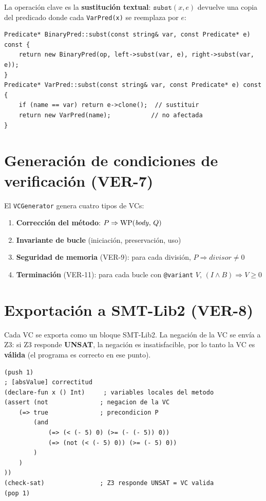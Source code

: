 La operación clave es la \textbf{sustitución textual}:
$\texttt{subst}(x, e)$ devuelve una copia del predicado donde cada
\texttt{VarPred(x)} se reemplaza por $e$:

\begin{lstlisting}[style=cpp, caption={Sustitución en BinaryPred}]
Predicate* BinaryPred::subst(const string& var, const Predicate* e) const {
    return new BinaryPred(op, left->subst(var, e), right->subst(var, e));
}
Predicate* VarPred::subst(const string& var, const Predicate* e) const {
    if (name == var) return e->clone();  // sustituir
    return new VarPred(name);           // no afectada
}
\end{lstlisting}

\section{Generación de condiciones de verificación (VER-7)}

El \texttt{VCGenerator} genera cuatro tipos de VCs:

\begin{enumerate}
  \item \textbf{Corrección del método}: $P \Rightarrow \mathrm{WP}(\mathit{body},\,Q)$
  \item \textbf{Invariante de bucle} (iniciación, preservación, uso)
  \item \textbf{Seguridad de memoria} (VER-9): para cada división,
    $P \Rightarrow \mathit{divisor} \neq 0$
  \item \textbf{Terminación} (VER-11): para cada bucle con \texttt{@variant} $V$,
    $(I \wedge B) \Rightarrow V \geq 0$
\end{enumerate}

\section{Exportación a SMT-Lib2 (VER-8)}

Cada VC se exporta como un bloque SMT-Lib2. La negación de la VC se envía
a Z3: si Z3 responde \textbf{UNSAT}, la negación es insatisfacible, por lo
tanto la VC es \textbf{válida} (el programa es correcto en ese punto).

\begin{lstlisting}[style=smt, caption={Formato SMT-Lib2 para una VC}]
(push 1)
; [absValue] correctitud
(declare-fun x () Int)     ; variables locales del metodo
(assert (not              ; negacion de la VC
    (=> true              ; precondicion P
        (and
            (=> (< (- 5) 0) (>= (- (- 5)) 0))
            (=> (not (< (- 5) 0)) (>= (- 5) 0))
        )
    )
))
(check-sat)               ; Z3 responde UNSAT = VC valida
(pop 1)
\end{lstlisting}

